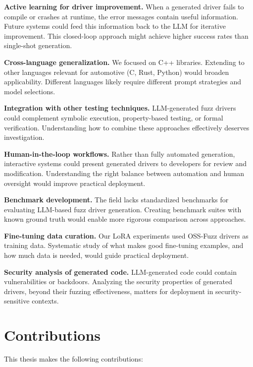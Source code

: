 \textbf{Active learning for driver improvement.} When a generated driver fails to compile or crashes at runtime, the error messages contain useful information. Future systems could feed this information back to the LLM for iterative improvement. This closed-loop approach might achieve higher success rates than single-shot generation.

\textbf{Cross-language generalization.} We focused on C++ libraries. Extending to other languages relevant for automotive (C, Rust, Python) would broaden applicability. Different languages likely require different prompt strategies and model selections.

\textbf{Integration with other testing techniques.} LLM-generated fuzz drivers could complement symbolic execution, property-based testing, or formal verification. Understanding how to combine these approaches effectively deserves investigation.

\textbf{Human-in-the-loop workflows.} Rather than fully automated generation, interactive systems could present generated drivers to developers for review and modification. Understanding the right balance between automation and human oversight would improve practical deployment.

\textbf{Benchmark development.} The field lacks standardized benchmarks for evaluating LLM-based fuzz driver generation. Creating benchmark suites with known ground truth would enable more rigorous comparison across approaches.

\textbf{Fine-tuning data curation.} Our LoRA experiments used OSS-Fuzz drivers as training data. Systematic study of what makes good fine-tuning examples, and how much data is needed, would guide practical deployment.

\textbf{Security analysis of generated code.} LLM-generated code could contain vulnerabilities or backdoors. Analyzing the security properties of generated drivers, beyond their fuzzing effectiveness, matters for deployment in security-sensitive contexts.


\section{Contributions}
\label{sec:discussion_summary}

This thesis makes the following contributions:

